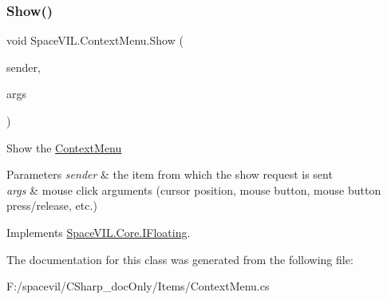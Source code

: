 \subsubsection{\texorpdfstring{Show()}{Show()}}
{\footnotesize\ttfamily void Space\+V\+I\+L.\+Context\+Menu.\+Show (\begin{DoxyParamCaption}\item[{\mbox{\hyperlink{interface_space_v_i_l_1_1_core_1_1_i_item}{I\+Item}}}]{sender,  }\item[{\mbox{\hyperlink{class_space_v_i_l_1_1_core_1_1_mouse_args}{Mouse\+Args}}}]{args }\end{DoxyParamCaption})}



Show the \mbox{\hyperlink{class_space_v_i_l_1_1_context_menu}{Context\+Menu}} 


\begin{DoxyParams}{Parameters}
{\em sender} & the item from which the show request is sent \\
\hline
{\em args} & mouse click arguments (cursor position, mouse button, mouse button press/release, etc.) \\
\hline
\end{DoxyParams}


Implements \mbox{\hyperlink{interface_space_v_i_l_1_1_core_1_1_i_floating}{Space\+V\+I\+L.\+Core.\+I\+Floating}}.



The documentation for this class was generated from the following file\+:\begin{DoxyCompactItemize}
\item 
F\+:/spacevil/\+C\+Sharp\+\_\+doc\+Only/\+Items/Context\+Menu.\+cs\end{DoxyCompactItemize}
